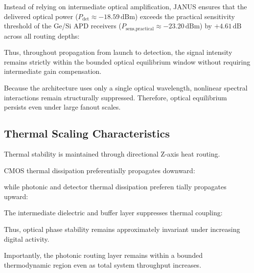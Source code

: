 \documentclass[journal]{IEEEtran}
\begin{document}
Instead of relying on intermediate optical amplification, JANUS ensures that the delivered optical power ($P_{\text{det}} \approx -18.59\,\text{dBm}$) exceeds the practical sensitivity threshold of the Ge/Si APD receivers ($P_{\text{sens,practical}} \approx -23.20\,\text{dBm}$) by $+4.61\,\text{dB}$ across all routing depths:

\begin{center}
\end{center}

Thus, throughout propagation from launch to detection, the signal intensity remains strictly within the bounded optical equilibrium window without requiring intermediate gain compensation.

Because the architecture uses only a single optical wavelength, nonlinear spectral interactions remain structurally suppressed. Therefore, optical equilibrium persists even under large fanout scales.

\subsection{\textbf{Thermal Scaling Characteristics}}

Thermal stability is maintained through directional Z-axis heat routing.

CMOS thermal dissipation preferentially propagates downward:

\begin{center}
\end{center}

while photonic and detector thermal dissipation preferen tially propagates upward:

\begin{center}
\end{center}

The intermediate dielectric and buffer layer suppresses thermal coupling:

\begin{center}
\end{center}

Thus, optical phase stability remains approximately invariant under increasing digital activity.

Importantly, the photonic routing layer remains within a bounded thermodynamic region even as total system throughput increases.
\end{document}
